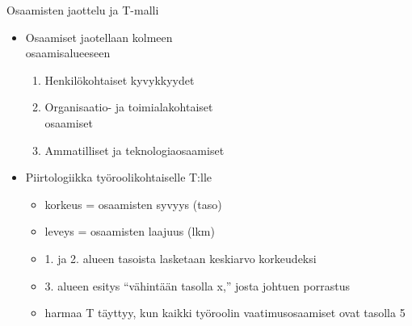 \documentclass[first=purple,second=dblue,logo=redquo]{aaltoslides}
\begin{document}
\begin{frame}{Osaamisten jaottelu ja T-malli}
\begin{itemize}
\item Osaamiset jaotellaan kolmeen \\ osaamisalueeseen
\begin{enumerate}
\item Henkilökohtaiset kyvykkyydet
\item Organisaatio- ja toimialakohtaiset \\ osaamiset
\item Ammatilliset ja teknologiaosaamiset
\end{enumerate}
\item Piirtologiikka työroolikohtaiselle T:lle
\begin{itemize}
\item korkeus = osaamisten syvyys (taso)
\item leveys = osaamisten laajuus (lkm)
\item 1. ja 2. alueen tasoista lasketaan keskiarvo korkeudeksi
\item 3. alueen esitys ``vähintään tasolla x,'' josta johtuen porrastus
\item harmaa T täyttyy, kun kaikki työroolin vaatimusosaamiset ovat tasolla 5
\end{itemize}
\end{itemize}
\end{frame}
\end{document}

